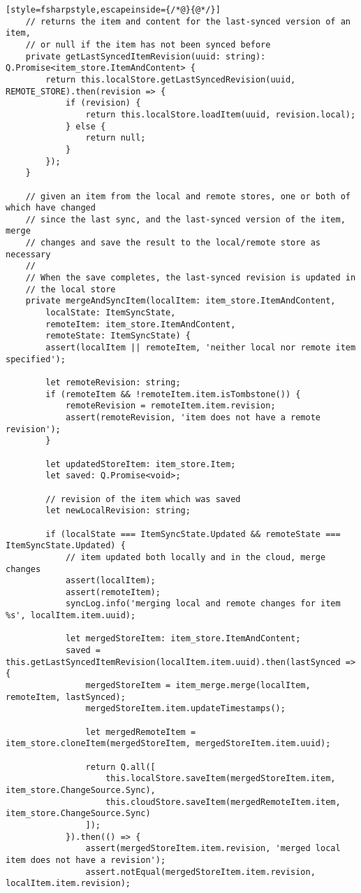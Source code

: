 \begin{lstlisting}[style=fsharpstyle,escapeinside={/*@}{@*/}]
	// returns the item and content for the last-synced version of an item,
	// or null if the item has not been synced before
	private getLastSyncedItemRevision(uuid: string): Q.Promise<item_store.ItemAndContent> {
		return this.localStore.getLastSyncedRevision(uuid, REMOTE_STORE).then(revision => {
			if (revision) {
				return this.localStore.loadItem(uuid, revision.local);
			} else {
				return null;
			}
		});
	}

	// given an item from the local and remote stores, one or both of which have changed
	// since the last sync, and the last-synced version of the item, merge
	// changes and save the result to the local/remote store as necessary
	//
	// When the save completes, the last-synced revision is updated in
	// the local store
	private mergeAndSyncItem(localItem: item_store.ItemAndContent,
		localState: ItemSyncState,
		remoteItem: item_store.ItemAndContent,
		remoteState: ItemSyncState) {
		assert(localItem || remoteItem, 'neither local nor remote item specified');

		let remoteRevision: string;
		if (remoteItem && !remoteItem.item.isTombstone()) {
			remoteRevision = remoteItem.item.revision;
			assert(remoteRevision, 'item does not have a remote revision');
		}

		let updatedStoreItem: item_store.Item;
		let saved: Q.Promise<void>;

		// revision of the item which was saved
		let newLocalRevision: string;

		if (localState === ItemSyncState.Updated && remoteState === ItemSyncState.Updated) {
			// item updated both locally and in the cloud, merge changes
			assert(localItem);
			assert(remoteItem);
			syncLog.info('merging local and remote changes for item %s', localItem.item.uuid);

			let mergedStoreItem: item_store.ItemAndContent;
			saved = this.getLastSyncedItemRevision(localItem.item.uuid).then(lastSynced => {
				mergedStoreItem = item_merge.merge(localItem, remoteItem, lastSynced);
				mergedStoreItem.item.updateTimestamps();

				let mergedRemoteItem = item_store.cloneItem(mergedStoreItem, mergedStoreItem.item.uuid);

				return Q.all([
					this.localStore.saveItem(mergedStoreItem.item, item_store.ChangeSource.Sync),
					this.cloudStore.saveItem(mergedRemoteItem.item, item_store.ChangeSource.Sync)
				]);
			}).then(() => {
				assert(mergedStoreItem.item.revision, 'merged local item does not have a revision');
				assert.notEqual(mergedStoreItem.item.revision, localItem.item.revision);


\end{lstlisting}

